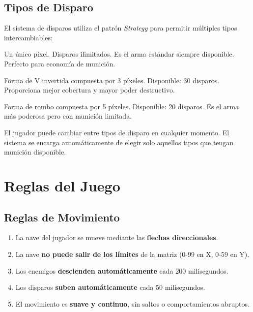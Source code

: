 \documentclass[12pt, a4paper]{article}
\begin{document}
\subsection{Tipos de Disparo}

El sistema de disparos utiliza el patrón \textit{Strategy} para permitir múltiples tipos intercambiables:

\begin{description}[leftmargin=2em, style=nextline]
    \item[\textbf{Pixel (Básico)}]
        Un único píxel. Disparos ilimitados. Es el arma estándar siempre disponible. Perfecto para economía de munición.
    
    \item[\textbf{Flecha (Intermedio)}]
        Forma de V invertida compuesta por 3 píxeles. Disponible: 30 disparos. Proporciona mejor cobertura y mayor poder destructivo.
    
    \item[\textbf{Rombo (Avanzado)}]
        Forma de rombo compuesta por 5 píxeles. Disponible: 20 disparos. Es el arma más poderosa pero con munición limitada.
\end{description}

El jugador puede cambiar entre tipos de disparo en cualquier momento. El sistema se encarga automáticamente de elegir solo aquellos tipos que tengan munición disponible.

\section{Reglas del Juego}

\subsection{Reglas de Movimiento}

\begin{enumerate}[leftmargin=2em]
    \item La nave del jugador se mueve mediante las \textbf{flechas direccionales}.
    \item La nave \textbf{no puede salir de los límites} de la matriz (0-99 en X, 0-59 en Y).
    \item Los enemigos \textbf{descienden automáticamente} cada 200 milisegundos.
    \item Los disparos \textbf{suben automáticamente} cada 50 milisegundos.
    \item El movimiento es \textbf{suave y continuo}, sin saltos o comportamientos abruptos.
\end{enumerate}
\end{document}
